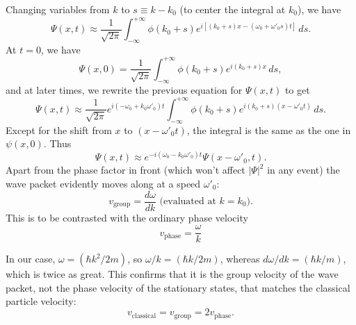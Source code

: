 \documentclass{article}
\begin{document}
Changing variables from $k$ to $s \equiv k - k_0$ (to center the integral at
$k_0$), we have \[
  \Psi(x, t) \approx \frac{1}{\sqrt{2\pi}}\int_{-\infty}^{+\infty}
    \phi(k_0 + s)e^{i[(k_0 + s)x - (\omega_0 + \omega'_0s)t]}
  \,ds.
\] At $t = 0$, we have \[
  \Psi(x, 0) = \frac{1}{\sqrt{2\pi}}\int_{-\infty}^{+\infty}
    \phi(k_0 + s)e^{i(k_0 + s)x}
  \,ds,
\] and at later times, we rewrite the previous equation for $\Psi(x, t)$ to get
\[
  \Psi(x, t)
  \approx \frac{1}{\sqrt{2\pi}}e^{i(-\omega_0 + k_0\omega'_0)t}
  \int_{-\infty}^{+\infty}
    \phi(k_0 + s)e^{i(k_0 + s)(x - \omega'_0t)}
  \,ds.
\] Except for the shift from $x$ to $(x - \omega'_0t)$, the integral is the
same as the one in $\psi(x, 0)$. Thus
\begin{equation} \label{eq:wave-pac-psi}
  \Psi(x, t) \approx e^{-i(\omega_0 - k_0\omega'_0)t}\Psi(x - \omega'_0, t).
\end{equation}
Apart from the phase factor in front (which won't affect $|\Psi|^2$ in any
event) the wave packet evidently moves along at a speed $\omega'_0$:
\begin{equation} \label{eq:wave-pac-vel-grp}
  v_{\text{group}} = \frac{d\omega}{dk}
  \text{ (evaluated at $k = k_0$)}.
\end{equation}
This is to be contrasted with the ordinary phase velocity
\begin{equation} \label{eq:wave-pac-vel-pha}
  v_{\text{phase}} = \frac{\omega}{k}
\end{equation}

In our case, $\omega = (\hbar k^2/2m)$, so $\omega/k = (\hbar k/2m)$, whereas
$d\omega/dk = (\hbar k/m)$, which is twice as great. This confirms that it is
the group velocity of the wave packet, not the phase velocity of the stationary
states, that matches the classical particle velocity:
\begin{equation} \label{eq:wave-pac-vel}
  v_{\text{classical}} = v_{\text{group}} = 2v_{\text{phase}}.
\end{equation}
\end{document}
